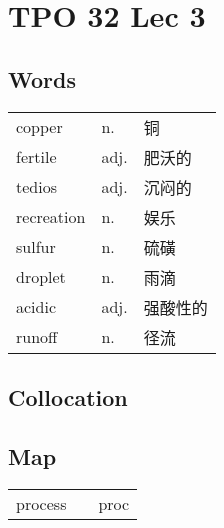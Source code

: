 \section{TPO 32 Lec 3}

\subsection{Words}

\begin{tabular}{lll}
    copper     & n.   & 铜    \\
    fertile    & adj. & 肥沃的  \\
    tedios     & adj. & 沉闷的  \\
    recreation & n.   & 娱乐   \\
    sulfur     & n.   & 硫磺   \\
    droplet    & n.   & 雨滴   \\
    acidic     & adj. & 强酸性的 \\
    runoff     & n.   & 径流   \\
\end{tabular}

\subsection{Collocation}

\subsection{Map}

\begin{tabular}{rc@{\quad$\to$\quad}l}
    process &  & proc \\
\end{tabular}


